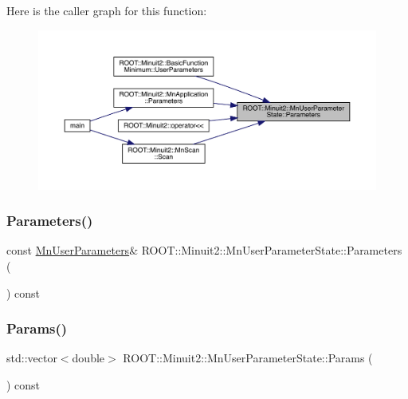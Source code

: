 Here is the caller graph for this function\+:
\nopagebreak
\begin{figure}[H]
\begin{center}
\leavevmode
\includegraphics[width=350pt]{d3/de0/classROOT_1_1Minuit2_1_1MnUserParameterState_a486a8fc38e1581efd228ed43604e3fa7_icgraph}
\end{center}
\end{figure}
\mbox{\label{classROOT_1_1Minuit2_1_1MnUserParameterState_a486a8fc38e1581efd228ed43604e3fa7}} 
\subsubsection{\texorpdfstring{Parameters()}{Parameters()}\hspace{0.1cm}{\footnotesize\ttfamily [3/3]}}
{\footnotesize\ttfamily const \mbox{\hyperlink{classROOT_1_1Minuit2_1_1MnUserParameters}{Mn\+User\+Parameters}}\& R\+O\+O\+T\+::\+Minuit2\+::\+Mn\+User\+Parameter\+State\+::\+Parameters (\begin{DoxyParamCaption}{ }\end{DoxyParamCaption}) const\hspace{0.3cm}{\ttfamily [inline]}}

\mbox{\label{classROOT_1_1Minuit2_1_1MnUserParameterState_acbdb3b1b3d7f4b9889bf10c2ac3e0785}} 
\subsubsection{\texorpdfstring{Params()}{Params()}\hspace{0.1cm}{\footnotesize\ttfamily [1/3]}}
{\footnotesize\ttfamily std\+::vector$<$double$>$ R\+O\+O\+T\+::\+Minuit2\+::\+Mn\+User\+Parameter\+State\+::\+Params (\begin{DoxyParamCaption}{ }\end{DoxyParamCaption}) const}

